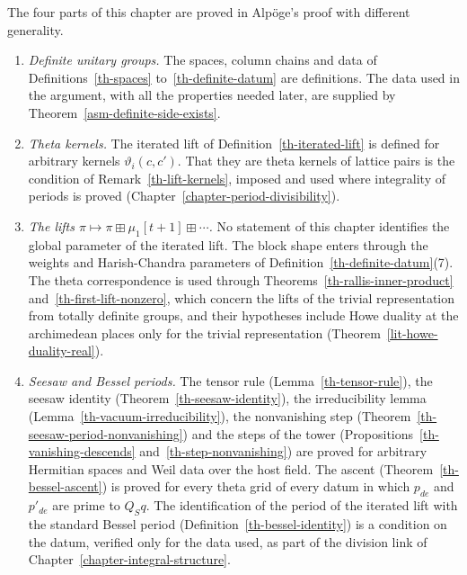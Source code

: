 \begin{remark}\label{th-scope}
The four parts of this chapter are proved in Alpöge's proof with different
generality.
\begin{enumerate}
\item \emph{Definite unitary groups.} The spaces, column chains and data of
  Definitions~\ref{th-spaces} to~\ref{th-definite-datum} are definitions.
  The data used in the argument, with all the properties needed later, are
  supplied by Theorem~\ref{asm-definite-side-exists}.
\item \emph{Theta kernels.} The iterated lift of
  Definition~\ref{th-iterated-lift} is defined for arbitrary kernels
  $\vartheta_i(c,c')$. That they are theta kernels of lattice pairs is the
  condition of Remark~\ref{th-lift-kernels}, imposed and used where integrality
  of periods is proved (Chapter~\ref{chapter-period-divisibility}).
\item \emph{The lifts $\pi\mapsto\pi\boxplus\mu_1[t+1]\boxplus\cdots$.} No
  statement of this chapter identifies the global parameter of the iterated
  lift. The block shape enters through the weights and Harish-Chandra
  parameters of Definition~\ref{th-definite-datum}(7). The theta
  correspondence is used through Theorems~\ref{th-rallis-inner-product}
  and~\ref{th-first-lift-nonzero}, which concern the lifts of the trivial
  representation from totally definite groups, and their hypotheses include
  Howe duality at the archimedean places only for the trivial representation
  (Theorem~\ref{lit-howe-duality-real}).
\item \emph{Seesaw and Bessel periods.} The tensor rule
  (Lemma~\ref{th-tensor-rule}), the seesaw identity
  (Theorem~\ref{th-seesaw-identity}), the irreducibility lemma
  (Lemma~\ref{th-vacuum-irreducibility}), the nonvanishing step
  (Theorem~\ref{th-seesaw-period-nonvanishing}) and the steps of the tower
  (Propositions~\ref{th-vanishing-descends} and~\ref{th-step-nonvanishing})
  are proved for arbitrary Hermitian spaces and Weil data over the host field. The ascent
  (Theorem~\ref{th-bessel-ascent}) is proved for every theta grid of every
  datum in which $p_{de}$ and $p'_{de}$ are prime to $Q_Sq$. The identification of the period of the iterated lift with the
  standard Bessel period (Definition~\ref{th-bessel-identity}) is a condition
  on the datum, verified only for the data used, as part of the division link
  of Chapter~\ref{chapter-integral-structure}.
\end{enumerate}
\end{remark}
